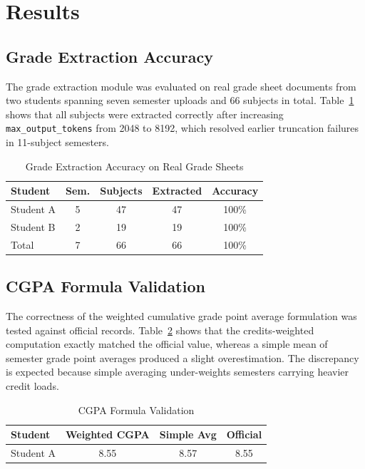 \documentclass{article}
\begin{document}
\section{Results}
\subsection{Grade Extraction Accuracy}
The grade extraction module was evaluated on real grade sheet documents from two students spanning seven semester uploads and 66 subjects in total. Table~\ref{tab:extraction} shows that all subjects were extracted correctly after increasing \texttt{max\_output\_tokens} from 2048 to 8192, which resolved earlier truncation failures in 11-subject semesters.

\begin{table}[t]
\caption{Grade Extraction Accuracy on Real Grade Sheets}
\label{tab:extraction}
\centering
\begin{tabular}{lcccc}
\toprule
Student & Sem. & Subjects & Extracted & Accuracy \\
\midrule
Student A & 5 & 47 & 47 & 100\% \\
Student B & 2 & 19 & 19 & 100\% \\
Total & 7 & 66 & 66 & 100\% \\
\bottomrule
\end{tabular}
\end{table}

\subsection{CGPA Formula Validation}
The correctness of the weighted cumulative grade point average formulation was tested against official records. Table~\ref{tab:cgpa-validation} shows that the credits-weighted computation exactly matched the official value, whereas a simple mean of semester grade point averages produced a slight overestimation. The discrepancy is expected because simple averaging under-weights semesters carrying heavier credit loads.

\begin{table}[t]
\caption{CGPA Formula Validation}
\label{tab:cgpa-validation}
\centering
\begin{tabular}{lccc}
\toprule
Student & Weighted CGPA & Simple Avg & Official \\
\midrule
Student A & 8.55 & 8.57 & 8.55 \\
\bottomrule
\end{tabular}
\end{table}
\end{document}
